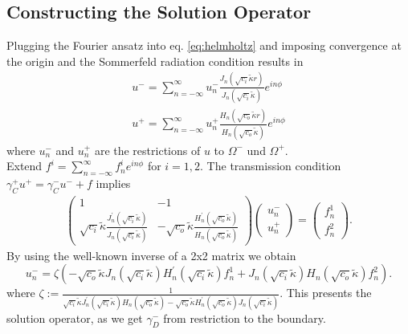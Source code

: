 \documentclass[12pt,journal,compsoc, onecolumn]{IEEEtran}
\begin{document}
\subsection{Constructing the Solution Operator}
Plugging the Fourier ansatz into eq. \ref{eq:helmholtz} and imposing convergence at the origin and 
the Sommerfeld radiation condition results in
\begin{align}
    u^- = \sum\limits_{n = -\infty}^\infty u_n^- \frac{J_n(\sqrt{ c_i} \tilde \kappa r)}{J_n(\sqrt{ c_i} \tilde \kappa)} e^{i n \phi} \nonumber \\
    u^+ = \sum\limits_{n = -\infty}^\infty u_n^+ \frac{H_n(\sqrt{ c_o} \tilde \kappa r)}{H_n(\sqrt{ c_o} \tilde \kappa)} e^{i n \phi} \nonumber
\end{align}
where $u_n^-$ and $u_n^+$ are the restrictions of $u$ to $\Omega^-$ und $\Omega^+$.\\
Extend $f^i = \sum\limits_{n = -\infty}^\infty f^i_n e^{in\phi}$ for $i=1,2$. The transmission condition $\gamma_{C}^{+} u^{+}=\gamma_{C}^{-} u^{-}+f$ implies 
\begin{align}
    \begin{pmatrix}
        1 & -1 \\
        \sqrt{c_i} \tilde \kappa \frac{J_n^\prime(\sqrt{c_i} \tilde \kappa)}{J_n(\sqrt{c_i} \tilde \kappa)} & 
        -  \sqrt{c_o} \tilde \kappa \frac{H_n^\prime(\sqrt{c_o} \tilde \kappa)}{H_n(\sqrt{c_o} \tilde \kappa)}
    \end{pmatrix} 
    \begin{pmatrix}
        u_n^- \\u_n^+
    \end{pmatrix}
    = 
    \begin{pmatrix}
        f_n^1 \\ f_n^2
    \end{pmatrix}.
\end{align} 
By using the well-known inverse of a 2x2 matrix we obtain 
\begin{equation}
    u_n^- = \zeta(-\sqrt{c_o}\tilde \kappa J_n(\sqrt{c_i} \tilde \kappa) H_n^\prime(\sqrt{c_i} \tilde \kappa)f_n^1 
    + J_n(\sqrt{c_i} \tilde \kappa) H_n(\sqrt{c_o} \tilde \kappa) f_n^2).
\end{equation}
where $\zeta := \frac{1}{\sqrt{c_i} \tilde \kappa J_n^\prime(\sqrt{c_i} \tilde \kappa) H_n(\sqrt{c_o} \tilde \kappa)
-\sqrt{c_o} \tilde \kappa H_n^\prime(\sqrt{c_o}\tilde \kappa) J_n(\sqrt{c_i} \tilde \kappa)
}$.
This presents the solution operator, as we get $\gamma_D^-$ from restriction to the boundary.
\end{document}
